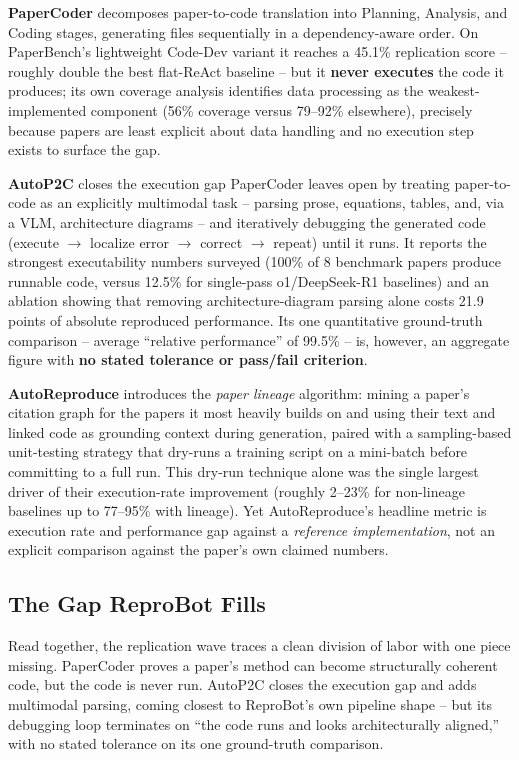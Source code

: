 \documentclass[11pt]{article}
\begin{document}
\textbf{PaperCoder} \cite{seo2025papercoder} decomposes paper-to-code translation into
Planning, Analysis, and Coding stages, generating files sequentially in a
dependency-aware order. On PaperBench's lightweight Code-Dev variant it reaches a 45.1\%
replication score -- roughly double the best flat-ReAct baseline -- but it
\textbf{never executes} the code it produces; its own coverage analysis identifies data
processing as the weakest-implemented component (56\% coverage versus 79--92\%
elsewhere), precisely because papers are least explicit about data handling and no
execution step exists to surface the gap.

\textbf{AutoP2C} \cite{lin2025autop2c} closes the execution gap PaperCoder leaves open by
treating paper-to-code as an explicitly multimodal task -- parsing prose, equations,
tables, and, via a VLM, architecture diagrams -- and iteratively debugging the generated
code (execute $\to$ localize error $\to$ correct $\to$ repeat) until it runs. It reports
the strongest executability numbers surveyed (100\% of 8 benchmark papers produce
runnable code, versus 12.5\% for single-pass o1/DeepSeek-R1 baselines) and an ablation
showing that removing architecture-diagram parsing alone costs 21.9 points of absolute
reproduced performance. Its one quantitative ground-truth comparison -- average
``relative performance'' of 99.5\% -- is, however, an aggregate figure with
\textbf{no stated tolerance or pass/fail criterion}.

\textbf{AutoReproduce} \cite{zhao2025autoreproduce} introduces the \emph{paper lineage}
algorithm: mining a paper's citation graph for the papers it most heavily builds on and
using their text and linked code as grounding context during generation, paired with a
sampling-based unit-testing strategy that dry-runs a training script on a mini-batch
before committing to a full run. This dry-run technique alone was the single largest
driver of their execution-rate improvement (roughly 2--23\% for non-lineage baselines up
to 77--95\% with lineage). Yet AutoReproduce's headline metric is execution rate and
performance gap against a \emph{reference implementation}, not an explicit comparison
against the paper's own claimed numbers.

\subsection{The Gap ReproBot Fills}

Read together, the replication wave traces a clean division of labor with one piece
missing. PaperCoder proves a paper's method can become structurally coherent code, but
the code is never run. AutoP2C closes the execution gap and adds multimodal parsing,
coming closest to ReproBot's own pipeline shape -- but its debugging loop terminates on
``the code runs and looks architecturally aligned,'' with no stated tolerance on its one
ground-truth comparison.
\end{document}
